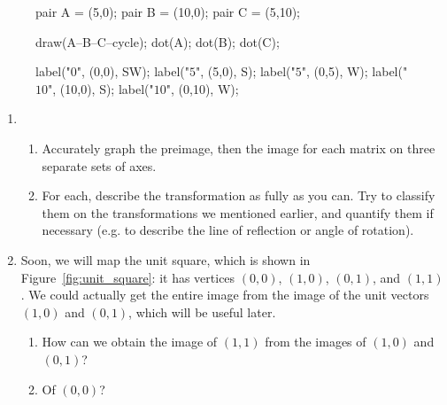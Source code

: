 \documentclass[../textbook.tex]{subfiles}
\begin{document}
\begin{figure}[h]
\begin{center}
\begin{minipage}[c]{0.35\textwidth}
\begin{center}
\begin{minipage}[b]{\textwidth}
\begin{asy}[width=0.7\textwidth]
						pair A = (5,0);
						pair B = (10,0);
						pair C = (5,10);
						
						draw(A--B--C--cycle);
						dot(A);
						dot(B);
						dot(C);
						
						label("$0$", (0,0), SW);
						label("$5$", (5,0), S);
						label("$5$", (0,5), W);
						label("$10$", (10,0), S);
						label("$10$", (0,10), W);
					\end{asy}
				\end{minipage}
			\end{center}
			\vspace*{-2\baselineskip}
			\begin{center}
				\begin{minipage}[t]{\textwidth}
					\label{fig:preimage_tri}
				\end{minipage}
			\end{center}
		\end{minipage}
	\end{center}
	\vspace*{-2\baselineskip}
\end{figure}

\begin{enumerate}
\item[]
\begin{enumerate}
\setcounter{enumii}{\value{another_name}}
\item Accurately graph the preimage, then the image for each matrix on three separate sets of axes.
\item For each, describe the transformation as fully as you can. Try to classify them on the transformations we mentioned earlier, and quantify them if necessary (e.g. to describe the line of reflection or angle of rotation).
\end{enumerate}
\setcounter{enumi}{\value{mp_problem_i}}
\item Soon, we will map the unit square, which is shown in Figure~\ref{fig:unit_square}: it has vertices $(0,0)$, $(1,0)$, $(0,1)$, and $(1,1)$. We could actually get the entire image from the image of the unit vectors $(1,0)$ and $(0,1)$, which will be useful later. %
\begin{enumerate}
\item How can we obtain the image of $(1,1)$ from the images of $(1,0)$ and $(0,1)$?
\item Of $(0,0)$?
\end{enumerate}
\setcounter{mp_problem_i}{\value{enumi}}
\end{enumerate}
\end{document}

